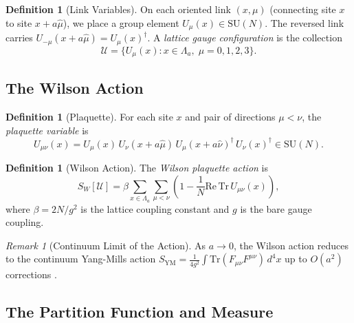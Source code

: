 \documentclass[12pt, a4paper]{article}
\theoremstyle{plain}
\theoremstyle{definition}
\newtheorem{definition}[theorem]{Definition}
\theoremstyle{remark}
\newtheorem{remark}[theorem]{Remark}
\newcommand{\SU}{\mathrm{SU}}
\newcommand{\Tr}{\mathrm{Tr}}
\begin{document}
\begin{definition}[Link Variables]\label{def:links}
  On each oriented link $(x, \mu)$ (connecting site $x$ to site $x + a\hat{\mu}$),
  we place a group element $U_\mu(x) \in \SU(N)$. The reversed link carries
  $U_{-\mu}(x + a\hat{\mu}) = U_\mu(x)^\dagger$. A \emph{lattice gauge
  configuration} is the collection
  \begin{equation}
    \mathcal{U} = \{U_\mu(x) : x \in \Lambda_a, \; \mu = 0,1,2,3\}.
  \end{equation}
\end{definition}

\subsection{The Wilson Action}

\begin{definition}[Plaquette]\label{def:plaquette}
  For each site $x$ and pair of directions $\mu < \nu$, the
  \emph{plaquette variable} is
  \begin{equation}\label{eq:plaquette}
    U_{\mu\nu}(x) = U_\mu(x) \, U_\nu(x + a\hat{\mu}) \,
    U_\mu(x + a\hat{\nu})^\dagger \, U_\nu(x)^\dagger \in \SU(N).
  \end{equation}
\end{definition}

\begin{definition}[Wilson Action]\label{def:wilson_action}
  The \emph{Wilson plaquette action} is
  \begin{equation}\label{eq:wilson_action}
    S_W[\mathcal{U}] = \beta \sum_{x \in \Lambda_a} \sum_{\mu < \nu}
    \left(1 - \frac{1}{N} \mathrm{Re}\, \Tr\, U_{\mu\nu}(x)\right),
  \end{equation}
  where $\beta = 2N/g^2$ is the lattice coupling constant and $g$ is the
  bare gauge coupling.
\end{definition}

\begin{remark}[Continuum Limit of the Action]
  As $a \to 0$, the Wilson action reduces to the continuum Yang-Mills action
  $S_{\text{YM}} = \frac{1}{4g^2}\int \Tr(F_{\mu\nu} F^{\mu\nu})\,d^4x$
  up to $O(a^2)$ corrections \citep{Wilson1974, CreutzBook}.
\end{remark}

\subsection{The Partition Function and Measure}
\end{document}
